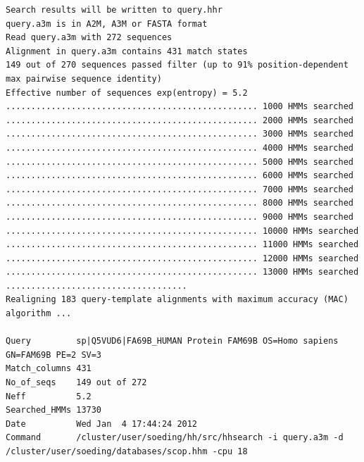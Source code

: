 \documentclass[11pt,a4paper]{article}
\begin{document}
\scriptsize
\begin{verbatim}
Search results will be written to query.hhr
query.a3m is in A2M, A3M or FASTA format
Read query.a3m with 272 sequences
Alignment in query.a3m contains 431 match states
149 out of 270 sequences passed filter (up to 91% position-dependent max pairwise sequence identity)
Effective number of sequences exp(entropy) = 5.2 
.................................................. 1000 HMMs searched
.................................................. 2000 HMMs searched
.................................................. 3000 HMMs searched
.................................................. 4000 HMMs searched
.................................................. 5000 HMMs searched
.................................................. 6000 HMMs searched
.................................................. 7000 HMMs searched
.................................................. 8000 HMMs searched
.................................................. 9000 HMMs searched
.................................................. 10000 HMMs searched
.................................................. 11000 HMMs searched
.................................................. 12000 HMMs searched
.................................................. 13000 HMMs searched
....................................
Realigning 183 query-template alignments with maximum accuracy (MAC) algorithm ...

Query         sp|Q5VUD6|FA69B_HUMAN Protein FAM69B OS=Homo sapiens GN=FAM69B PE=2 SV=3
Match_columns 431
No_of_seqs    149 out of 272
Neff          5.2 
Searched_HMMs 13730
Date          Wed Jan  4 17:44:24 2012
Command       /cluster/user/soeding/hh/src/hhsearch -i query.a3m -d /cluster/user/soeding/databases/scop.hhm -cpu 18 


\end{verbatim}
\end{document}
